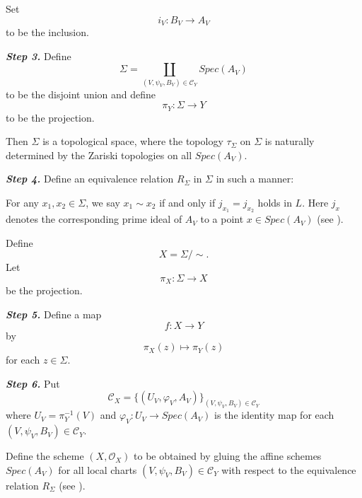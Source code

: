 \documentclass[12pt,twoside,reqno]{amsart}
\theoremstyle{definition}
\numberwithin{equation}{section}
\begin{document}
Set
\begin{equation*}
i_{V}:B_{V}\rightarrow A_{V}
\end{equation*}to be the inclusion.

\emph{\textbf{Step 3.}} Define
\begin{equation*}
\Sigma =\coprod\limits_{\left( V,\psi _{V},B_{V}\right) \in \mathcal{C}_{Y}}Spec\left( A_{V}\right)
\end{equation*}
to be the disjoint union and define
\begin{equation*}
\pi _{Y}:\Sigma \rightarrow Y
\end{equation*}to be the projection.

Then $\Sigma $ is a topological space, where the topology $\tau _{\Sigma }$
on $\Sigma $ is naturally determined by the Zariski topologies on all $Spec\left( A_{V}\right) .$

\emph{\textbf{Step 4.}} Define an equivalence relation $R_{\Sigma}$ in $\Sigma$ in such a manner:

For any $x_{1},x_{2}\in \Sigma $, we say
$
x_{1}\sim x_{2}
$
if and only if
$
j_{x_{1}}=j_{x_{2}}
$
holds in $L$. Here $j_{x}$ denotes the corresponding prime ideal of $A_{V}$ to a point $x\in Spec\left( A_{V}\right) $ (see \cite{EGA}).

Define
\begin{equation*}
X=\Sigma /\sim .
\end{equation*}
Let
\begin{equation*}
\pi _{X}:\Sigma \rightarrow X
\end{equation*}
be the projection.

\emph{\textbf{Step 5.}} Define a map
\begin{equation*}
f:X\rightarrow Y
\end{equation*}by
\begin{equation*}
\pi _{X}\left( z\right) \longmapsto \pi _{Y}\left( z\right)
\end{equation*}for each $z\in \Sigma $.

\emph{\textbf{Step 6.}} Put
\begin{equation*}
\mathcal{C}_{X}=\{\left( U_{V},\varphi _{V},A_{V}\right) \}_{\left( V,\psi
_{V},B_{V}\right) \in \mathcal{C}_{Y}}
\end{equation*}where $U_{V}=\pi _{Y}^{-1}\left( V\right) $ and $\varphi
_{V}:U_{V}\rightarrow Spec(A_{V})$ is the identity map for each $\left(
V,\psi _{V},B_{V}\right) \in \mathcal{C}_{Y}$.

Define the scheme
$
\left( X,\mathcal{O}_{X}\right)
$
to be obtained by gluing the affine schemes $Spec\left( A_{V}\right) $ for
all local charts $\left( V,\psi _{V},B_{V}\right) \in \mathcal{C}_{Y}$ with
respect to the equivalence relation $R_{\Sigma }$ (see \cite{EGA,Hrtsh}).
\end{document}
